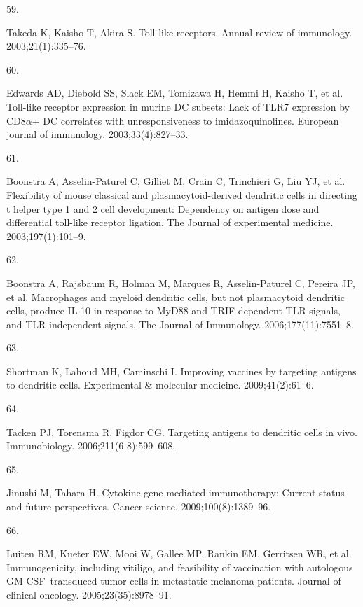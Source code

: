 \documentclass[
]{article}
\newlength{\cslhangindent}
\newlength{\csllabelwidth}
\newenvironment{CSLReferences}[2] %
 {\begin{list}{}{%
  \setlength{\itemindent}{0pt}
  \setlength{\leftmargin}{0pt}
  \setlength{\parsep}{0pt}
  \ifodd #1
   \setlength{\leftmargin}{\cslhangindent}
   \setlength{\itemindent}{-1\cslhangindent}
  \fi
  \setlength{\itemsep}{#2\baselineskip}}}
 {\end{list}}
\newcommand{\CSLLeftMargin}[1]{\parbox[t]{\csllabelwidth}{\strut#1\strut}}
\newcommand{\CSLRightInline}[1]{\parbox[t]{\linewidth - \csllabelwidth}{\strut#1\strut}}
\begin{document}
\begin{CSLReferences}{0}{1}
\CSLLeftMargin{59. }%
\CSLRightInline{Takeda K, Kaisho T, Akira S. Toll-like receptors. Annual
review of immunology. 2003;21(1):335--76. }

\CSLLeftMargin{60. }%
\CSLRightInline{Edwards AD, Diebold SS, Slack EM, Tomizawa H, Hemmi H,
Kaisho T, et al. Toll-like receptor expression in murine DC subsets:
Lack of TLR7 expression by CD8\(\alpha\)+ DC correlates with
unresponsiveness to imidazoquinolines. European journal of immunology.
2003;33(4):827--33. }

\CSLLeftMargin{61. }%
\CSLRightInline{Boonstra A, Asselin-Paturel C, Gilliet M, Crain C,
Trinchieri G, Liu YJ, et al. Flexibility of mouse classical and
plasmacytoid-derived dendritic cells in directing t helper type 1 and 2
cell development: Dependency on antigen dose and differential toll-like
receptor ligation. The Journal of experimental medicine.
2003;197(1):101--9. }

\CSLLeftMargin{62. }%
\CSLRightInline{Boonstra A, Rajsbaum R, Holman M, Marques R,
Asselin-Paturel C, Pereira JP, et al. Macrophages and myeloid dendritic
cells, but not plasmacytoid dendritic cells, produce IL-10 in response
to MyD88-and TRIF-dependent TLR signals, and TLR-independent signals.
The Journal of Immunology. 2006;177(11):7551--8. }

\CSLLeftMargin{63. }%
\CSLRightInline{Shortman K, Lahoud MH, Caminschi I. Improving vaccines
by targeting antigens to dendritic cells. Experimental \& molecular
medicine. 2009;41(2):61--6. }

\CSLLeftMargin{64. }%
\CSLRightInline{Tacken PJ, Torensma R, Figdor CG. Targeting antigens to
dendritic cells in vivo. Immunobiology. 2006;211(6-8):599--608. }

\CSLLeftMargin{65. }%
\CSLRightInline{Jinushi M, Tahara H. Cytokine gene-mediated
immunotherapy: Current status and future perspectives. Cancer science.
2009;100(8):1389--96. }

\CSLLeftMargin{66. }%
\CSLRightInline{Luiten RM, Kueter EW, Mooi W, Gallee MP, Rankin EM,
Gerritsen WR, et al. Immunogenicity, including vitiligo, and feasibility
of vaccination with autologous GM-CSF--transduced tumor cells in
metastatic melanoma patients. Journal of clinical oncology.
2005;23(35):8978--91. }


\end{CSLReferences}
\end{document}
